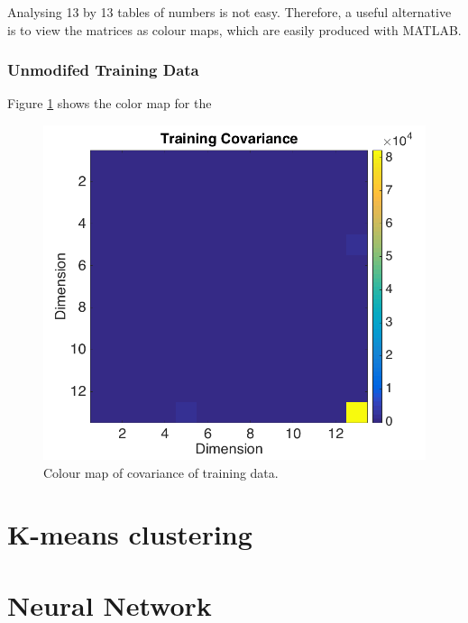 \documentclass[a4paper, 10pt, conference]{ieeeconf}
\begin{document}
Analysing 13 by 13 tables of numbers is not easy. Therefore, a useful alternative is to view the matrices as colour maps, which are easily produced with MATLAB.

\subsubsection{Unmodifed Training Data}
Figure \ref{fig:covtrainingone} shows the color map for the 

\begin{figure}[!ht]
    \centering
    \includegraphics[width=\linewidth]{pic/covtraining.png}
    \caption{Colour map of covariance of training data.}
    \label{fig:covtrainingone}
\end{figure}

\section{K-means clustering}

\section{Neural Network}
\end{document}
